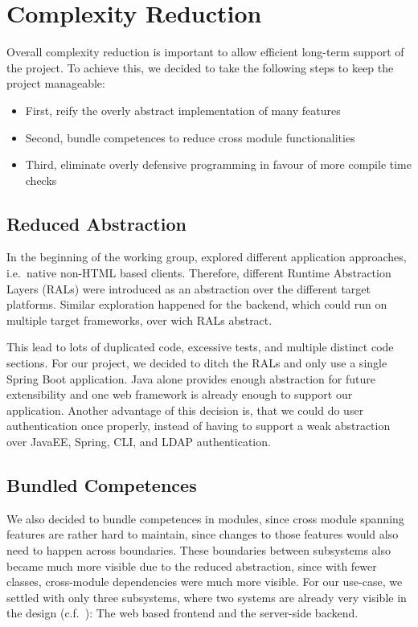 \section{Complexity Reduction}\label{sec:complexityReduction}
Overall complexity reduction is important to allow efficient long-term support of the project.
To achieve this, we decided to take the following steps to keep the project manageable:
\begin{itemize}
    \item First, reify the overly abstract implementation of many features
    \item Second, bundle competences to reduce cross module functionalities
    \item Third, eliminate overly defensive programming in favour of more compile time checks
\end{itemize}

\subsection*{Reduced Abstraction}
In the beginning of the working group, \citet{maier2015multidevice} explored different application approaches, i.e.\
native non-HTML based clients.
Therefore, different Runtime Abstraction Layers (RALs) were introduced as an abstraction over the different target
platforms.
Similar exploration happened for the backend, which could run on multiple target frameworks, over wich RALs abstract.

This lead to lots of duplicated code, excessive tests, and multiple distinct  code sections.
For our project, we decided to ditch the RALs and only use a single Spring Boot application.
Java alone provides enough abstraction for future extensibility and one web framework is already enough to support our
application.
Another advantage of this decision is, that we could do user authentication once properly, instead of having to support
a weak abstraction over JavaEE, Spring, CLI, and LDAP authentication.

\subsection*{Bundled Competences}
We also decided to bundle competences in modules, since cross module spanning features are rather hard to maintain,
since changes to those features would also need to happen across boundaries.
These boundaries between subsystems also became much more visible due to the reduced abstraction, since with fewer
classes, cross-module dependencies were much more visible.
For our use-case, we settled with only three subsystems, where two systems are already very visible in the design
(c.f.\ \Cref{fig:systemArchitecture}): The web based frontend and the server-side backend.

